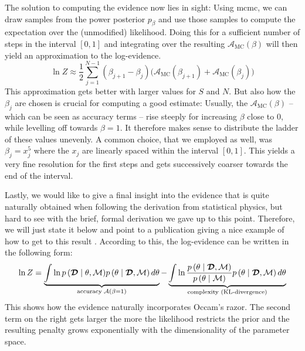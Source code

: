 \documentclass[\relativeRoot/main.tex]{subfiles}
\begin{document}
%
The solution to computing the evidence now lies in sight: Using \gls{mcmc}, we can draw samples from the power posterior $p_\beta$ and use those samples to compute the expectation over the (unmodified) likelihood. Doing this for a sufficient number of steps in the interval $\left[ 0, 1 \right]$ and integrating over the resulting $\mathcal{A}_\text{MC}(\beta)$ will then yield an approximation to the log-evidence.
%
\begin{equation}
    \ln{Z} \approx \frac{1}{2} \sum_{j=1}^{N-1} \left( \beta_{j+1} - \beta_j \right) \big( \mathcal{A}_\text{MC}(\beta_{j+1}) + \mathcal{A}_\text{MC}(\beta_j) \big)
\end{equation}
%
This approximation gets better with larger values for $S$ and $N$. But also how the $\beta_j$ are chosen is crucial for computing a good estimate: Usually, the $\mathcal{A}_\text{MC}(\beta)$ -- which can be seen as accuracy terms -- rise steeply for increasing $\beta$ close to 0, while levelling off towards $\beta=1$. It therefore makes sense to distribute the ladder of these values unevenly. A common choice, that we employed as well, was $\beta_j = x_j^5$ where the $x_j$ are linearly spaced within the interval $[0, 1]$. This yields a very fine resolution for the first steps and gets successively coarser towards the end of the interval.

Lastly, we would like to give a final insight into the evidence that is quite naturally obtained when following the derivation from statistical physics, but hard to see with the brief, formal derivation we gave up to this point. Therefore, we will just state it below and point to a publication giving a nice example of how to get to this result \cite{aponte_introduction_2022}. According to this, the log-evidence can be written in the following form:
%
\begin{equation} \label{eq:bilateral:acc_vs_kl}
    \ln{Z} = \underbrace{\int{ \ln{ p \left( \boldsymbol{\mathcal{D}} \mid \theta, \mathcal{M} \right) } p \left( \theta \mid \boldsymbol{\mathcal{D}}, \mathcal{M} \right) d\theta}}_{\text{accuracy} \; \mathcal{A}(\beta = 1)} - \underbrace{\int{ \ln{ \frac{p \left( \theta \mid \boldsymbol{\mathcal{D}}, \mathcal{M} \right)}{p \left( \theta \mid \mathcal{M} \right)} } p \left( \theta \mid \boldsymbol{\mathcal{D}}, \mathcal{M} \right) d\theta}}_\text{complexity (KL-divergence)}
\end{equation}
%
This shows how the evidence naturally incorporates Occam's razor. The second term on the right gets larger the more the likelihood restricts the prior and the resulting penalty grows exponentially with the dimensionality of the parameter space.
\end{document}
